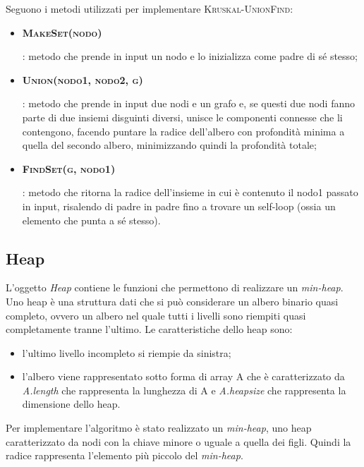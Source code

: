 Seguono i metodi utilizzati per implementare \textsc{Kruskal-UnionFind}:
\begin{itemize}
    \item \hypertarget{makeset}{\textbf{\textsc{MakeSet(nodo)}}}: metodo che prende in input un nodo e lo inizializza come padre di sé stesso;
    
    \item \hypertarget{union}{\textbf{\textsc{Union(nodo1, nodo2, g)}}}: metodo che prende in input due nodi e un grafo e, se questi due nodi fanno parte di due insiemi disguinti diversi, unisce le componenti connesse che li contengono, facendo puntare la radice dell'albero con profondità minima a quella del secondo albero, minimizzando quindi la profondità totale;
    
    \item \hypertarget{findset}{\textbf{\textsc{FindSet(g, nodo1)}}}: metodo che ritorna la radice dell'insieme in cui è contenuto il nodo1 passato in input, risalendo di padre in padre fino a trovare un self-loop (ossia un elemento che punta a sé stesso).
\end{itemize}

\newpage


\subsection{Heap}
\label{Heap}

L'oggetto \textit{Heap} contiene le funzioni che permettono di realizzare un \textit{min-heap}. Uno heap è una struttura dati che si può considerare un albero binario quasi completo, ovvero un albero nel quale tutti i livelli sono riempiti quasi completamente tranne l'ultimo. Le caratteristiche dello heap sono:

\begin{itemize}
    \item l'ultimo livello incompleto si riempie da sinistra;
    \item l'albero viene rappresentato sotto forma di array A che è caratterizzato da \textit{A.length} che rappresenta la lunghezza di A e \textit{A.heapsize} che rappresenta la dimensione dello heap.
\end{itemize}


Per implementare l'algoritmo è stato realizzato un \textit{min-heap}, uno heap caratterizzato da nodi con la chiave minore o uguale a quella dei figli. Quindi la radice rappresenta l'elemento più piccolo del \textit{min-heap}.


